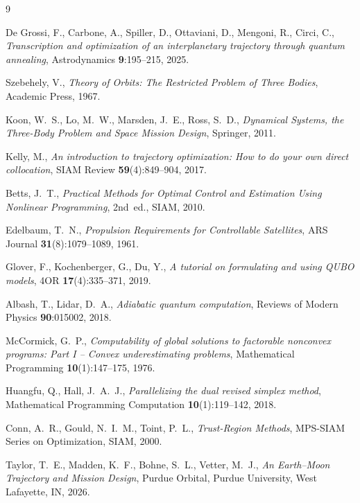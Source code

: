 \documentclass[11pt,a4paper]{article}
\theoremstyle{plain}
\begin{document}
\begin{thebibliography}{9}

  De Grossi, F., Carbone, A., Spiller, D., Ottaviani, D.,
  Mengoni, R., Circi, C.,
  \emph{Transcription and optimization of an interplanetary
   trajectory through quantum annealing},
  Astrodynamics \textbf{9}:195--215, 2025.

  Szebehely, V., \emph{Theory of Orbits: The Restricted Problem
   of Three Bodies}, Academic Press, 1967.

  Koon, W.~S., Lo, M.~W., Marsden, J.~E., Ross, S.~D.,
  \emph{Dynamical Systems, the Three-Body Problem and Space
   Mission Design}, Springer, 2011.

  Kelly, M., \emph{An introduction to trajectory optimization:
   How to do your own direct collocation}, SIAM Review
  \textbf{59}(4):849--904, 2017.

  Betts, J.~T., \emph{Practical Methods for Optimal Control and
   Estimation Using Nonlinear Programming}, 2nd~ed., SIAM, 2010.

  Edelbaum, T.~N., \emph{Propulsion Requirements for Controllable
   Satellites}, ARS Journal \textbf{31}(8):1079--1089, 1961.

  Glover, F., Kochenberger, G., Du, Y., \emph{A tutorial on
   formulating and using QUBO models},
  4OR \textbf{17}(4):335--371, 2019.

  Albash, T., Lidar, D.~A., \emph{Adiabatic quantum computation},
  Reviews of Modern Physics \textbf{90}:015002, 2018.

  McCormick, G.~P., \emph{Computability of global solutions to
   factorable nonconvex programs: Part I -- Convex
   underestimating problems}, Mathematical Programming
  \textbf{10}(1):147--175, 1976.

  Huangfu, Q., Hall, J.~A.~J., \emph{Parallelizing the dual
   revised simplex method}, Mathematical Programming Computation
  \textbf{10}(1):119--142, 2018.

  Conn, A.~R., Gould, N.~I.~M., Toint, P.~L., \emph{Trust-Region
   Methods}, MPS-SIAM Series on Optimization, SIAM, 2000.

  Taylor, T.~E., Madden, K.~F., Bohne, S.~L., Vetter, M.~J.,
  \emph{An Earth--Moon Trajectory and Mission Design},
  Purdue Orbital, Purdue University, West Lafayette, IN, 2026.

\end{thebibliography}
\end{document}
